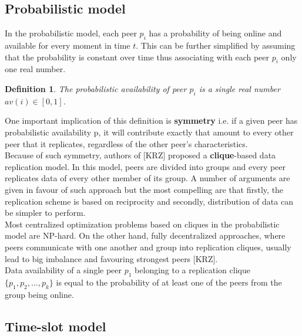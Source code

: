 \documentclass{pracamgren}
\newcounter{collective_ctr} \numberwithin{collective_ctr}{section}
\newtheorem{definition}{Definition}[collective_ctr]
\begin{document}
\subsection{Probabilistic model}


In the probabilistic model, each peer $p_i$ has a probability of being online and available for every moment in time $t$. This can be further simplified by assuming that the probability is constant over time thus associating with each peer $p_i$ only one real number.

\begin{definition}
The {\it probabilistic availability} of peer $p_i$ is a single real number $av(i) \in [0,1]$.
\end{definition}

One important implication of this definition is {\bf symmetry} i.e. if a given peer has probabilistic availability p, it will contribute exactly that amount to every other peer that it replicates, regardless of the other peer's characteristics.\\

Because of such symmetry, authors of [KRZ] proposed a {\bf clique}-based data replication model. In this model, peers are divided into groups and every peer replicates data of every other member of its group. A number of arguments are given in favour of such approach but the most compelling are that firstly, the replication scheme is based on reciprocity and secondly, distribution of data can be simpler to perform.\\

Most centralized optimization problems based on cliques in the probabilistic model are NP-hard. On the other hand, fully decentralized approaches, where peers communicate with one another and group into replication cliques, usually lead to big imbalance and favouring strongest peers [KRZ].\\

Data availability of a single peer $p_1$ belonging to a replication clique $\{p_{1}, p_{2}, \ldots, p_{k}\}$ is equal to the probability of at least one of the peers from the group being online.\\

\subsection{Time-slot model}
\end{document}

